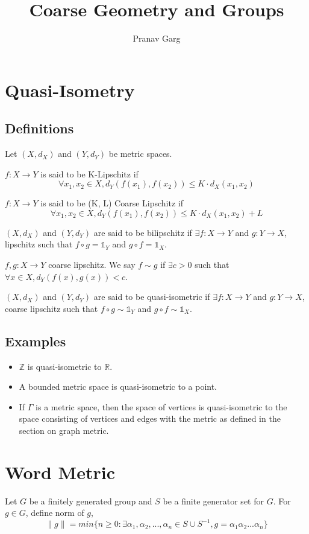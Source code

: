 \documentclass{article}
\begin{document}
\setlength{\parskip}{10pt plus 1pt minus 1pt}
\title{Coarse Geometry and Groups}
\author{Pranav Garg}
\maketitle
\section{Quasi-Isometry}
\subsection*{Definitions}
Let $(X, d_X)$ and $(Y, d_Y)$ be metric spaces.

$f:X\rightarrow Y$ is said to be K-Lipschitz if\[\forall x_1, x_2\in X, d_Y(f(x_1),f(x_2))\leq K\cdot d_X(x_1, x_2)\]

$f:X\rightarrow Y$ is said to be (K, L) Coarse Lipschitz if\[\forall x_1, x_2 \in X, d_Y(f(x_1),f(x_2)) \leq K\cdot d_X(x_1, x_2) + L\]

$(X,d_X)$ and $(Y, d_Y)$ are said to be bilipschitz if $\exists f:X\rightarrow Y$ and $g:Y\rightarrow X$, lipschitz such that $f\circ g=\mathds{1}_Y$ and $g\circ f=\mathds{1}_X$.

$f, g : X\rightarrow Y$ coarse lipschitz. We say $f\sim g$ if $\exists c>0$ such that $\forall x\in X, d_Y(f(x), g(x))<c$.

$(X,d_X)$ and $(Y, d_Y)$ are said to be quasi-isometric if $\exists f : X\rightarrow Y$ and $g : Y\rightarrow X$, coarse lipschitz such that $f\circ g\sim \mathds{1}_Y$ and $g\circ f\sim \mathds{1}_X$.

\subsection*{Examples}
\begin{itemize}

\item $\mathbb{Z}$ is quasi-isometric to $\mathbb{R}$.
\item A bounded metric space is quasi-isometric to a point.
\item If $\Gamma$ is a metric space, then the space of vertices is quasi-isometric to the space consisting of vertices and edges with the metric as defined in the section on graph metric.
\end{itemize}
\section{Word Metric}
Let $G$ be a finitely generated group and $S$ be a finite generator set for $G$.
For $g\in G$, define norm of $g$, \[\|g\| = min\{n \geq 0 : \exists \alpha_1, \alpha_2,..., \alpha_n \in S\cup S^{-1}, g=\alpha_1 \alpha_2 ...\alpha_n\} \]
\end{document}
